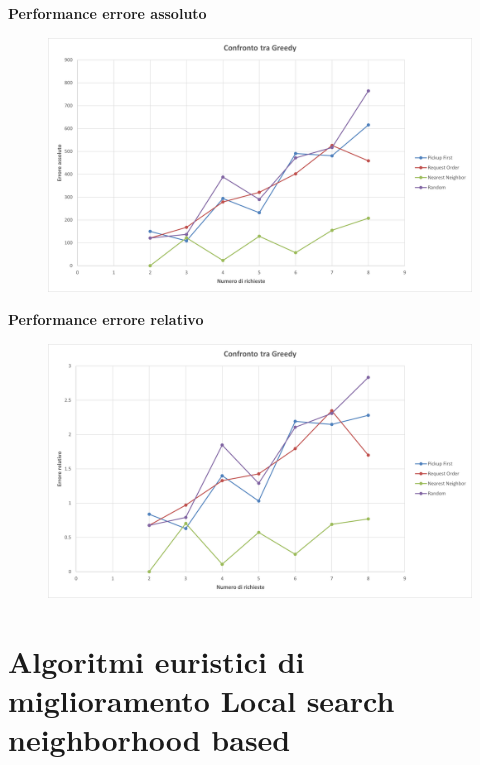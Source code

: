 \documentclass[9pt]{beamer}
\begin{document}
\begin{frame}[allowframebreaks]{\subsecname}
	\textbf{Performance errore assoluto}
      	\begin{figure}[h]
	\centering
	\includegraphics[width=\textwidth]
	{../charts/08c Confronto tra Greedy}
	\end{figure}

\framebreak

	\textbf{Performance errore relativo}
      	\begin{figure}[h]
	\centering
	\includegraphics[width=\textwidth]
	{../charts/08d Confronto tra Greedy}
	\end{figure}

\end{frame}


\section{Algoritmi euristici di miglioramento\newline
\footnotesize{Local search neighborhood based}}
\end{document}
